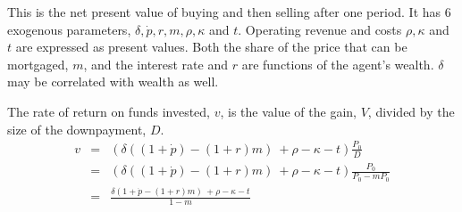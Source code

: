 This is the  net present value of buying and then selling after one period. It has  6 exogenous parameters, $\delta, \dot p, r, m, \rho, \kappa$ and $t$.   Operating revenue and costs $\rho, \kappa$ and $t$ are expressed as  present values. Both the  share of the price  that can be mortgaged, $m$, and the interest rate  and $r$ are functions of the agent's wealth. $\delta$ may be correlated with wealth as well. 

The rate of return on funds invested, $v$, is the value of the gain, $V$, divided by  the size of the downpayment, $D$. 
\begin{eqnarray}
v&=&( \delta((1+\dot p)  - (1+r)m) \ + \rho   	-\kappa - t ) \frac{P_0}{D}   \nonumber\\
		&=&( \delta((1+\dot p)  - (1+r)m) \ + \rho   	-\kappa - t ) \frac{P_0}{P_0-mP_0}   \nonumber\\ 
		&=&\frac{ \delta(1+\dot p  - (1+r)m) \ + \rho   	-\kappa - t } {1-m} \label{Eqn:DecisionRule2}
\end{eqnarray}





